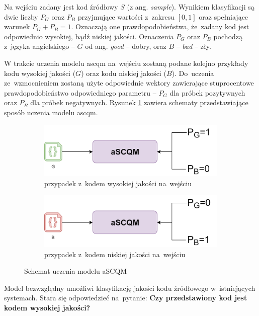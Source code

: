 \documentclass[twoside]{praca}
\begin{document}
Na wejściu zadany jest kod źródłowy $S$ (z ang. \textit{sample}). Wynikiem klasyfikacji są dwie liczby $P_G$ oraz $P_B$ przyjmujące wartości z~zakresu $[0,1]$ oraz spełniające warunek $P_G+P_B=1$. Oznaczają one prawdopodobieństwa, że~zadany kod jest odpowiednio wysokiej, bądź niskiej jakości. Oznaczenia $P_G$ oraz $P_B$ pochodzą z~języka angielskiego -- $G$ od ang. \textit{good} -- dobry, oraz $B$ -- \textit{bad} -- zły.

W trakcie uczenia modelu \gls{ascqm} na~wejściu zostaną podane kolejno przykłady kodu wysokiej jakości ($G$) oraz kodu niskiej jakości ($B$). Do~uczenia ze~wzmocnieniem zostaną użyte odpowiednie wektory zawierające stuprocentowe prawdopodobieństwo odpowiedniego parametru -- $P_G$ dla próbek pozytywnych oraz $P_B$ dla próbek negatywnych. Rysunek \ref{fig:proj:ascqm-l} zawiera schematy przedstawiające sposób uczenia modelu \gls{ascqm}.

\begin{figure}[h]
\centering
\begin{subfigure}{.5\textwidth}
  \centering
  \includegraphics[width=.98\linewidth]{proj/ascqm-g.png}
  \caption{przypadek z~kodem wysokiej jakości na~wejściu}
\end{subfigure}%
\begin{subfigure}{.5\textwidth}
  \centering
  \includegraphics[width=.98\linewidth]{proj/ascqm-b.png}
  \caption{przypadek z~kodem niskiej jakości na~wejściu}
\end{subfigure}
\caption{Schemat uczenia modelu aSCQM}
\label{fig:proj:ascqm-l}
\end{figure}

Model bezwzględny umożliwi klasyfikację jakości kodu źródłowego w~istniejących systemach. Stara się odpowiedzieć na~pytanie: \textbf{Czy przedstawiony kod jest kodem wysokiej jakości?}
\end{document}
